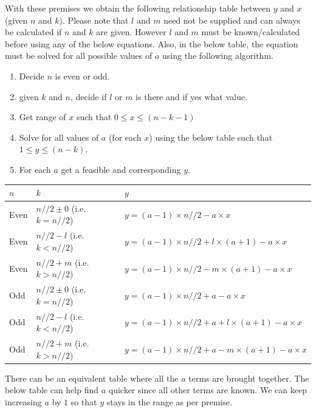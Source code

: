 \documentclass[12pt, twoside]{article}
\begin{document}
With these premises we obtain the following relationship table between $y$ and $x$ (given $n$ and $k$). Please note that $l$ and $m$ need not be supplied and can always be calculated if $n$ and $k$ are given. However $l$ and $m$ must be known/calculated before using any of the below equations. Also, in the below table, the equation must be solved for all possible values of $\textbf{$a$}$ using the following algorithm.
\begin{enumerate}
    \item Decide $n$ is even or odd.
    \item given $k$ and $n$, decide if $l$ or $m$ is there and if yes what value.
    \item Get range of $x$ such that $0 \leq x \leq (n-k-1)$
    \item Solve for all values of $a$ (for each $x$) using the below table such that $1 \leq y \leq (n-k)$.
    \item For each $a$ get a feasible and corresponding $y$.
\end{enumerate}
\begin{tabular}{|l ||l ||l|}
	\hline
	\textbf{$n$} & \textbf{$k$} & \textbf{$y$} \\
	\hline
	Even & $n//2 \pm 0$ \space(i.e. $k = n//2$) & $y = (a-1)\times n//2 - a\times x$ \\
	\hline
	Even & $n//2 - l$ \space(i.e. $k < n//2$) & $y = (a-1)\times n//2 + l \times (a+1) - a\times x$ \\
	\hline
	Even & $n//2 + m$ (i.e. $k > n//2$) & $y = (a-1)\times n//2 - m \times (a+1) - a\times x$ \\
	\hline
	Odd & $n//2 \pm 0$ \space(i.e. $k = n//2$) & $y = (a-1)\times n//2 + a - a\times x$ \\
	\hline
	Odd & $n//2 - l$ \space(i.e. $k < n//2$) & $y = (a-1)\times n//2 + a + l\times(a+1) - a\times x$ \\
	\hline
	Odd & $n//2 + m$ (i.e. $k > n//2$)  & $y = (a-1)\times n//2 + a -m\times(a+1) - a\times x$ \\
	\hline
\end{tabular}\newline\newline
There can be an equivalent table where all the $a$ terms are brought together. The below table can help find $a$ quicker since all other terms are known. We can keep increasing $a$ by $1$ so that $y$ stays in the range as per premise.\newline\newline
\end{document}
